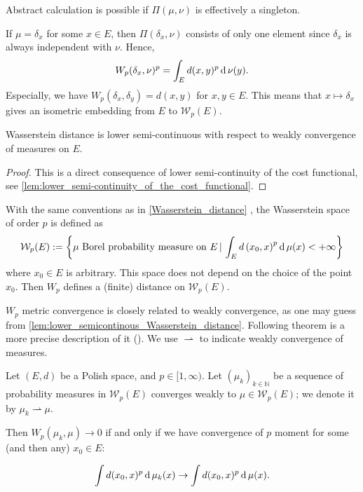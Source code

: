Abstract calculation is possible if $\Pi(\mu,\nu)$ is effectively a singleton.
\begin{example}
	\label{example:delta_measure_Wasserstein_distance}
	If $\mu=\delta_x$ for some $x \in E$,
	then $\Pi(\delta_x, \nu)$ consists of only one element since $\delta_x$ is always independent with $\nu$.
	Hence,
	\[
		W_p(\delta_x, \nu)^p = \int_{E} d(x, y)^p \operatorname{d} \nu(y).
	\]
	Especially, we have $W_p(\delta_x, \delta_y) = d(x,y)$ for $x,y \in E$.
	This means that $x \mapsto \delta_x$ gives an isometric embedding from $E$ to $\mathcal{W}_p(E)$.
\end{example}

\begin{lem}
	\label{lem:lower_semicontinous_Wasserstein_distance}
	Wasserstein distance is lower semi-continuous with respect to weakly convergence of measures on $E$.
\end{lem}

\begin{proof}
	This is a direct consequence of lower semi-continuity of the cost functional, see \cref{lem:lower_semi-continuity_of_the_cost_functional}.
\end{proof}

\begin{defn}
	\label{Wasserstein_space}
	With the same conventions as in \cref{Wasserstein_distance} , the Wasserstein space of order \( p \) is defined as
	\[
		\mathcal{W}_p(E): = \left\{ \mu \text{ Borel  probability measure on } E \,|
		\, \int _ { E } d \left( x _ { 0 } , x \right) ^ { p } \operatorname{d} \mu (x) < + \infty \right\}
	\]
	where \( x _ { 0 } \in E \) is arbitrary. This space does not depend on the choice of the point \( x _ { 0 } \). Then \( W _ { p } \) defines a (finite) distance on \( \mathcal{W}_p(E) \).
\end{defn}

$W_p$ metric convergence is closely related to weakly convergence,
as one may guess from \cref{lem:lower_semicontinous_Wasserstein_distance}.
Following theorem is a more precise description of it (\cite[Theorem 6.9]{villani2008optimal}).
We use $\rightharpoonup$ to indicate weakly convergence of measures.

\begin{thm}
	\label{thm:Wp_metricizes_weak_convergence}
	Let \( ( E , d ) \) be a Polish space, and \( p \in [ 1 , \infty ) \).
	Let \( \left( \mu _ { k } \right) _ { k \in \mathbb{ N } } \) be a
	sequence of probability measures in \( \mathcal{W}_p ( E ) \)
	converges weakly to \( \mu \in \mathcal{W}_p(E)	\);
	we denote it by $\mu_k \rightharpoonup \mu$.

	Then \( W_p \left( \mu _ { k }, \mu \right) \rightarrow 0 \)
	if and only if we have convergence of $p$ moment for
	some (and then any) \( x _ { 0 } \in E\):

	\[
		\int d ( x _ { 0 } , x ) ^ { p } \operatorname{d} \mu _ { k } ( x ) \rightarrow \int d ( x _ { 0 } , x ) ^ { p } \operatorname{d} \mu ( x ).
	\]

\end{thm}

